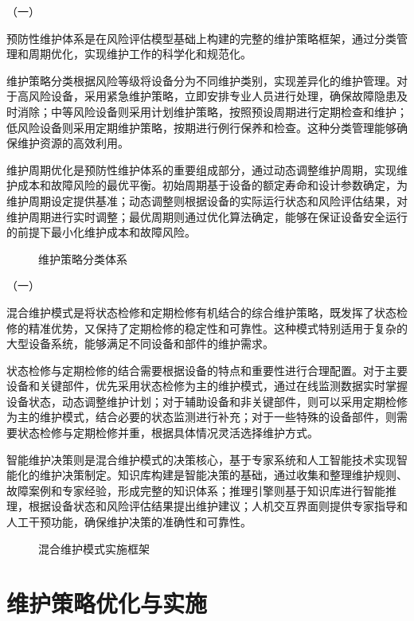 （一）

预防性维护体系是在风险评估模型基础上构建的完整的维护策略框架，通过分类管理和周期优化，实现维护工作的科学化和规范化。

维护策略分类根据风险等级将设备分为不同维护类别，实现差异化的维护管理。对于高风险设备，采用紧急维护策略，立即安排专业人员进行处理，确保故障隐患及时消除；中等风险设备则采用计划维护策略，按照预设周期进行定期检查和维护；低风险设备则采用定期维护策略，按期进行例行保养和检查。这种分类管理能够确保维护资源的高效利用。

维护周期优化是预防性维护体系的重要组成部分，通过动态调整维护周期，实现维护成本和故障风险的最优平衡。初始周期基于设备的额定寿命和设计参数确定，为维护周期设定提供基准；动态调整则根据设备的实际运行状态和风险评估结果，对维护周期进行实时调整；最优周期则通过优化算法确定，能够在保证设备安全运行的前提下最小化维护成本和故障风险。

\begin{figure}[h]
\centering
\caption{维护策略分类体系}
\label{fig:maintenance_strategy_classification}
\end{figure}

（一）

混合维护模式是将状态检修和定期检修有机结合的综合维护策略，既发挥了状态检修的精准优势，又保持了定期检修的稳定性和可靠性。这种模式特别适用于复杂的大型设备系统，能够满足不同设备和部件的维护需求。

状态检修与定期检修的结合需要根据设备的特点和重要性进行合理配置。对于主要设备和关键部件，优先采用状态检修为主的维护模式，通过在线监测数据实时掌握设备状态，动态调整维护计划；对于辅助设备和非关键部件，则可以采用定期检修为主的维护模式，结合必要的状态监测进行补充；对于一些特殊的设备部件，则需要状态检修与定期检修并重，根据具体情况灵活选择维护方式。

智能维护决策则是混合维护模式的决策核心，基于专家系统和人工智能技术实现智能化的维护决策制定。知识库构建是智能决策的基础，通过收集和整理维护规则、故障案例和专家经验，形成完整的知识体系；推理引擎则基于知识库进行智能推理，根据设备状态和风险评估结果提出维护建议；人机交互界面则提供专家指导和人工干预功能，确保维护决策的准确性和可靠性。

\begin{figure}[h]
\centering
\caption{混合维护模式实施框架}
\label{fig:hybrid_maintenance_model}
\end{figure}

\section{维护策略优化与实施}

